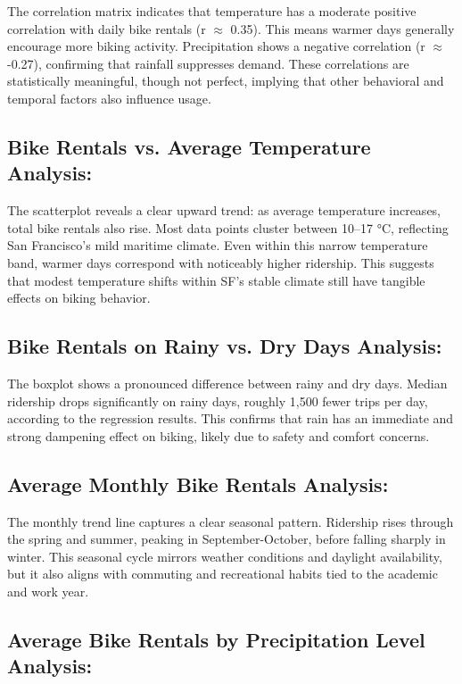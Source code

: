 \documentclass{article}
\begin{document}
The correlation matrix indicates that temperature has a moderate positive correlation with daily bike rentals (r $\approx$ 0.35). This means warmer days generally encourage more biking activity. Precipitation shows a negative correlation (r $\approx$ -0.27), confirming that rainfall suppresses demand. These correlations are statistically meaningful, though not perfect, implying that other behavioral and temporal factors also influence usage.

\subsection{\textbf{Bike Rentals vs. Average Temperature Analysis:}}

The scatterplot reveals a clear upward trend: as average temperature increases, total bike rentals also rise.
Most data points cluster between 10--17 °C, reflecting San Francisco's mild maritime climate.
Even within this narrow temperature band, warmer days correspond with noticeably higher ridership. This suggests that modest temperature shifts within SF's stable climate still have tangible effects on biking behavior.

\subsection{\textbf{Bike Rentals on Rainy vs. Dry Days Analysis:}}

The boxplot shows a pronounced difference between rainy and dry days.
Median ridership drops significantly on rainy days, roughly 1,500 fewer trips per day, according to the regression results.
This confirms that rain has an immediate and strong dampening effect on biking, likely due to safety and comfort concerns.

\subsection{\textbf{Average Monthly Bike Rentals Analysis:}}

The monthly trend line captures a clear seasonal pattern.
Ridership rises through the spring and summer, peaking in September-October, before falling sharply in winter.
This seasonal cycle mirrors weather conditions and daylight availability, but it also aligns with commuting and recreational habits tied to the academic and work year.

\subsection{\textbf{Average Bike Rentals by Precipitation Level Analysis:}}
\end{document}
